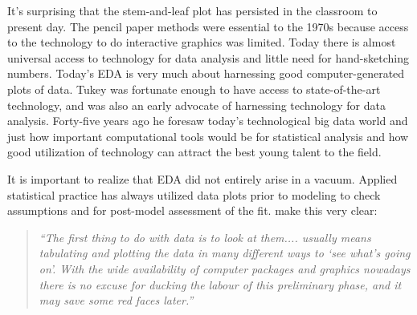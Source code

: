 \documentclass[11pt]{article}
\begin{document}
It's surprising that the stem-and-leaf plot has persisted in the classroom to present day. The pencil paper methods were essential to the 1970s because access to the technology to do interactive graphics was limited. Today there is almost universal access to technology for data analysis and little need for hand-sketching numbers. Today's EDA is very much about harnessing good computer-generated plots of data. Tukey was fortunate enough to have access to state-of-the-art technology, and was also an early advocate of harnessing technology for data analysis. Forty-five years ago he foresaw today's technological big data world and just how important computational tools would be for statistical analysis and how good utilization of technology can attract the best young talent to the field.





It is important to realize that EDA did not entirely arise in a vacuum. Applied statistical practice has always utilized data plots prior to modeling to check assumptions and for post-model assessment of the fit. \citet{CH90} make this very clear:

\begin{quote}
{\em ``The first thing to do with data is to look at them.... usually
means tabulating and plotting the data in many different ways to `see
what's going on'. With the wide availability of computer packages and
graphics nowadays there is no excuse for ducking the labour of this
preliminary phase, and it may save some red faces later.''}
\end{quote}
\end{document}
